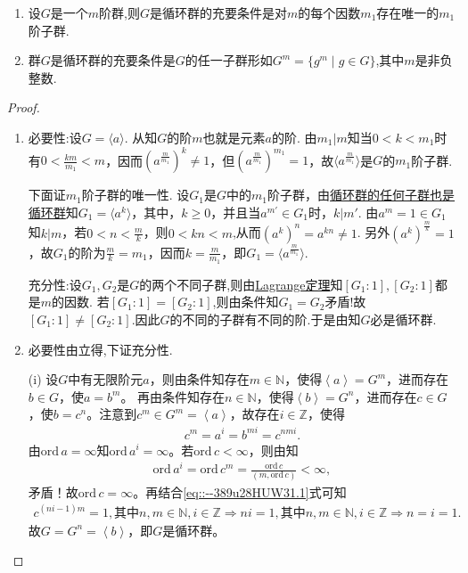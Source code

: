\documentclass[../../main.tex]{subfiles}%
\begin{document}
\begin{proposition}
\begin{enumerate}[(1)]
\item 设$G$是一个$m$阶群,则$G$是循环群的充要条件是对$m$的每个因数$m_1$存在唯一的$m_1$阶子群.

\item 群$G$是循环群的充要条件是$G$的任一子群形如$G^m=\{g^m\mid g\in G\}$,其中$m$是非负整数.
\end{enumerate}
\end{proposition}
\begin{proof}
\begin{enumerate}[(1)]
\item {\heiti 必要性:}设$G=\langle a\rangle$. 从知$G$的阶$m$也就是元素$a$的阶. 由$m_1|m$知当$0<k<m_1$时有$0<\frac{km}{m_1}<m$，因而$(a^{\frac{m}{m_1}})^k\neq 1$，但$(a^{\frac{m}{m_1}})^{m_1}=1$，故$\langle a^{\frac{m}{m_1}}\rangle$是$G$的$m_1$阶子群.

下面证$m_1$阶子群的唯一性. 设$G_1$是$G$中的$m_1$阶子群，由\hyperref[theorem:循环群的任何子群也是循环群]{循环群的任何子群也是循环群}知$G_1=\langle a^k\rangle$，其中，$k\geqslant 0$，并且当$a^{m'}\in G_1$时，$k|m'$. 由$a^m=1\in G_1$知$k|m$，若$0<n<\frac{m}{k}$，则$0<kn<m$,从而$(a^k)^n=a^{kn}\neq 1$. 另外$(a^k)^{\frac{m}{k}}=1$，故$G_1$的阶为$\frac{m}{k}=m_1$，因而$k=\frac{m}{m_1}$，即$G_1=\langle a^{\frac{m}{m_1}}\rangle$.

{\heiti 充分性:}设$G_1,G_2$是$G$的两个不同子群,则由\hyperref[theorem:抽象代数--Lagrange定理]{Lagrange定理}知$[G_1:1],[G_2:1]$都是$m$的因数.
若$[G_1:1]=[G_2:1]$,则由条件知$G_1=G_2$矛盾!故$[G_1:1]\ne [G_2:1]$.因此$G$的不同的子群有不同的阶.于是由知$G$必是循环群.

\item 必要性由立得,下证充分性.

(i) 设$G$中有无限阶元$a$，则由条件知存在$m\in\mathbb{N}$，使得$\left< a \right> =G^m$，进而存在$b\in G$，使$a=b^m$。
再由条件知存在$n\in\mathbb{N}$，使得$\left< b \right> =G^n$，进而存在$c\in G$，使$b=c^n$。注意到$c^m\in G^m=\left< a \right>$，故存在$i\in\mathbb{Z}$，使得
\begin{align}\label{eq::--389u28HUW31.1}
c^m=a^i=b^{mi}=c^{nmi}.
\end{align}
由$\mathrm{ord}\,a=\infty$知$\mathrm{ord}\,a^i=\infty$。若$\mathrm{ord}\,c<\infty$，则由知
\begin{align*}
\mathrm{ord}\,a^i=\mathrm{ord}\,c^m=\frac{\mathrm{ord}\,c}{(m,\mathrm{ord}\,c)}<\infty,
\end{align*}
矛盾！故$\mathrm{ord}\,c=\infty$。再结合\eqref{eq::--389u28HUW31.1}式可知
\begin{align*}
c^{(ni-1)m}=1,\text{其中}n,m\in\mathbb{N},i\in\mathbb{Z}\Longrightarrow ni=1,\text{其中}n,m\in\mathbb{N},i\in\mathbb{Z}\Longrightarrow n=i=1.
\end{align*}
故$G=G^n=\left< b \right>$，即$G$是循环群。


\end{enumerate}
\end{proof}
\end{document}
